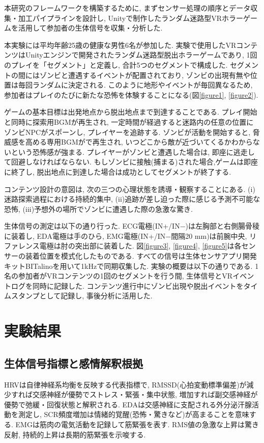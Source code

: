 \documentclass[a4paper]{jarticle}
\begin{document}
本研究のフレームワークを構築するために, まずセンサー処理の順序とデータ収集・加工パイプラインを設計し, Unityで制作したランダム迷路型VRホラーゲームを活用して参加者の生体信号を収集・分析した. 

本実験には平均年齢25歳の健康な男性6名が参加した.
実験で使用したVRコンテンツはUnityエンジンで開発されたランダム迷路型脱出ホラーゲームであり, 1回のプレイを「セグメント」と定義し, 合計5つのセグメントで構成した. セグメントの間にはゾンビと遭遇するイベントが配置されており, ゾンビの出現有無や位置は毎回ランダムに決定される. このように地形やイベントが毎回異なるため, 参加者はプレイのたびに新たな恐怖を体験することになる(図\ref{figure1}, \ref{figure2}).

ゲームの基本目標は出発地点から脱出地点まで到達することである. プレイ開始と同時に探索用BGMが再生され, 一定時間が経過すると迷路内の任意の位置にゾンビNPCがスポーンし, プレイヤーを追跡する. ゾンビが活動を開始すると, 脅威感を高める専用BGMがで再生され, いつどこから敵が近づいてくるかわからないという恐怖感が強まる. プレイヤーがゾンビと遭遇した場合は, 即座に逃走して回避しなければならない. もしゾンビに接触(捕まる)された場合,ゲームは即座に終了し, 脱出地点に到達した場合は成功としてセグメントが終了する.

コンテンツ設計の意図は, 次の三つの心理状態を誘導・観察することにある. (i)迷路探索過程における持続的集中, (ii)追跡が差し迫った際に感じる予測不可能な恐怖, (iii)予想外の場所でゾンビに遭遇した際の急激な驚き. 

生体信号の測定は以下の通り行った. ECG電極(IN+/IN−)は左胸部と右側腸骨稜に装着し, EDA電極は手のひら, EMG電極(IN+/IN−間隔20 mm)は前腕中央, リファレンス電極は肘の突出部に装着した. 図\ref{figure3}, \ref{figure4}, \ref{figure5}は各センサーの装着位置を模式化したものである. すべての信号は生体センサアプリ開発キットBITalinoを用いて1kHzで同期収集した.
実験の概要は以下の通りである. 1名の参加者がVRコンテンツの1回のセグメントを行う間, 生体信号とVRイベントログを同時に記録した. コンテンツ進行中にゾンビ出現や脱出イベントをタイムスタンプとして記録し, 事後分析に活用した.

\section{実験結果}%

\subsection{生体信号指標と感情解釈根拠}

HRVは自律神経系均衡を反映する代表指標で, RMSSD(心拍変動標準偏差)が減少すれば交感神経が優勢でストレス・緊張・集中状態, 増加すれば副交感神経が優勢で弛緩・回復状態と解釈される\cite{bib06,bib07}. EDAは交感神経に支配される外分泌汗腺活動を測定し, SCR頻度増加は情緒的覚醒(恐怖・驚きなど)が高まることを意味する\cite{bib08,bib09}. EMGは筋肉の電気活動を記録して筋緊張を表す. RMS値の急激な上昇は驚き反射, 持続的上昇は長期的筋緊張を示唆する\cite{bib10,bib11}.
\end{document}
